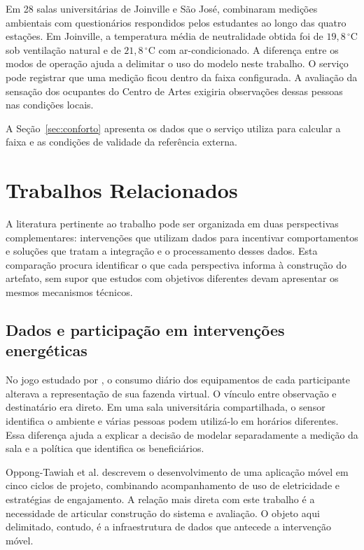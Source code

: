 \documentclass[tcc,capa]{texufpel}
\newif\ifemrevisao
\newcommand{\tintarevisao}{\ifemrevisao\color{correvisao}\fi}
\DeclareRobustCommand{\rev}[1]{{\tintarevisao #1}}
\begin{document}
\rev{Em 28 salas universitárias de Joinville e São José, \citet{custodio2024} combinaram medições ambientais com questionários respondidos pelos estudantes ao longo das quatro estações. Em Joinville, a temperatura média de neutralidade obtida foi de $19{,}8\,^{\circ}\mathrm{C}$ sob ventilação natural e de $21{,}8\,^{\circ}\mathrm{C}$ com ar-condicionado. A diferença entre os modos de operação ajuda a delimitar o uso do modelo neste trabalho. O serviço pode registrar que uma medição ficou dentro da faixa configurada. A avaliação da sensação dos ocupantes do Centro de Artes exigiria observações dessas pessoas nas condições locais.}

\rev{A Seção~\ref{sec:conforto} apresenta os dados que o serviço utiliza para calcular a faixa e as condições de validade da referência externa.}

\chapter{Trabalhos Relacionados}\label{cap:relacionados}
A literatura pertinente ao trabalho pode ser organizada em duas perspectivas complementares: intervenções que utilizam dados para incentivar comportamentos e soluções que tratam a integração e o processamento desses dados. Esta comparação procura identificar o que cada perspectiva informa à construção do artefato, sem supor que estudos com objetivos diferentes devam apresentar os mesmos mecanismos técnicos.

\section{Dados e participação em intervenções energéticas}
\rev{No jogo estudado por \citet{orland2014}, o consumo diário dos equipamentos de cada participante alterava a representação de sua fazenda virtual. O vínculo entre observação e destinatário era direto. Em uma sala universitária compartilhada, o sensor identifica o ambiente e várias pessoas podem utilizá-lo em horários diferentes. Essa diferença ajuda a explicar a decisão de modelar separadamente a medição da sala e a política que identifica os beneficiários.}

Oppong-Tawiah et al. \cite{oppong2020} descrevem o desenvolvimento de uma aplicação móvel em cinco ciclos de projeto, combinando acompanhamento de uso de eletricidade e estratégias de engajamento. A relação mais direta com este trabalho é a necessidade de articular construção do sistema e avaliação. O objeto aqui delimitado, contudo, é a infraestrutura de dados que antecede a intervenção móvel.
\end{document}
